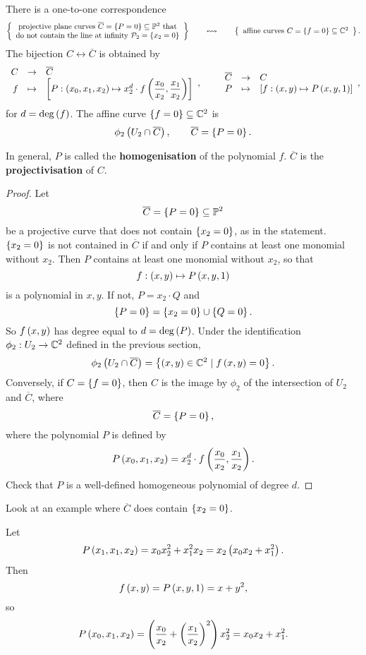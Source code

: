 \begin{theorem}
There is a one-to-one correspondence
$$ \correspondence{\text{projective plane curves} \ \overline{C} = \cb{P = 0} \subseteq \P^2 \ \text{that} \\ \text{do not contain the line at infinity} \ \PP_2 = \cb{x_2 = 0}}{\text{affine curves} \ C = \cb{f = 0} \subseteq \C^2}. $$
The bijection $ C \leftrightarrow \overline{C} $ is obtained by
$$ \function{C}{\overline{C}}{f}{\sb{P : \rb{x_0, x_1, x_2} \mapsto x_2^d \cdot f\rb{\dfrac{x_0}{x_2}, \dfrac{x_1}{x_2}}}}, \qquad \function{\overline{C}}{C}{P}{\sb{f : \rb{x, y} \mapsto P\rb{x, y, 1}}}, $$
for $ d = \deg\left( f \right) $. The affine curve $ \left\{ f = 0 \right\} \subseteq \mathbb{C}^2 $ is
$$ \phi_2\left( U_2 \cap \overline{C} \right), \qquad \overline{C} = \left\{ P = 0 \right\}. $$
\end{theorem}

\begin{notation}
In general, $ P $ is called the \textbf{homogenisation} of the polynomial $ f $. $ \overline{C} $ is the \textbf{projectivisation} of $ C $.
\end{notation}

\begin{proof}
Let
$$ \overline{C} = \left\{ P = 0 \right\} \subseteq \mathbb{P}^2 $$
be a projective curve that does not contain $ \left\{ x_2 = 0 \right\} $, as in the statement. $ \left\{ x_2 = 0 \right\} $ is not contained in $ \overline{C} $ if and only if $ P $ contains at least one monomial without $ x_2 $. Then $ P $ contains at least one monomial without $ x_2 $, so that
$$ f : \left( x, y \right) \mapsto P\left( x, y, 1 \right) $$
is a polynomial in $ x, y $. If not, $ P = x_2 \cdot Q $ and
$$ \left\{ P = 0 \right\} = \left\{ x_2 = 0 \right\} \cup \left\{ Q = 0 \right\}. $$
So $ f\left( x, y \right) $ has degree equal to $ d = \deg\left( P \right) $. Under the identification $ \phi_2 : U_2 \to \mathbb{C}^2 $ defined in the previous section,
$$ \phi_2\left( U_2 \cap \overline{C} \right) = \left\{ \left( x, y \right) \in \mathbb{C}^2 \mid f\left( x, y \right) = 0 \right\}. $$
Conversely, if $ C = \left\{ f = 0 \right\} $, then $ C $ is the image by $ \phi_2 $ of the intersection of $ U_2 $ and $ \overline{C} $, where
$$ \overline{C} = \left\{ P = 0 \right\}, $$
where the polynomial $ P $ is defined by
$$ P\left( x_0, x_1, x_2 \right) = x_2^d \cdot f\left( \dfrac{x_0}{x_2}, \dfrac{x_1}{x_2} \right). $$
Check that $ P $ is a well-defined homogeneous polynomial of degree $ d $.
\end{proof}

Look at an example where $ \overline{C} $ does contain $ \left\{ x_2 = 0 \right\} $.

\begin{example*}
Let
$$ P\left( x_1, x_1, x_2 \right) = x_0x_2^2 + x_1^2x_2 = x_2\left( x_0x_2 + x_1^2 \right). $$
Then
$$ f\left( x, y \right) = P\left( x, y, 1 \right) = x + y^2, $$
so
$$ P\left( x_0, x_1, x_2 \right) = \left( \dfrac{x_0}{x_2} + \left( \dfrac{x_1}{x_2} \right)^2 \right)x_2^2 = x_0x_2 + x_1^2. $$
\end{example*}

